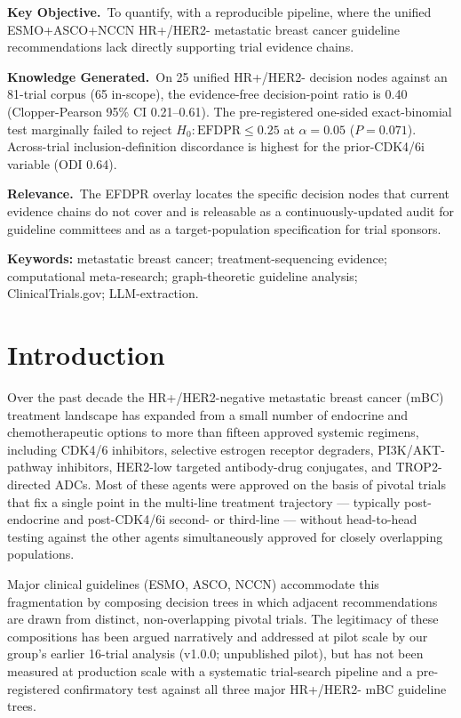 \documentclass[11pt,a4paper]{article}
\begin{document}
\medskip
\begin{mdframed}[linewidth=0.5pt,roundcorner=4pt,backgroundcolor=gray!8]
\small
\textbf{Key Objective.}\,
To quantify, with a reproducible pipeline, where the unified ESMO+ASCO+NCCN HR+/HER2- metastatic breast cancer guideline recommendations lack directly supporting trial evidence chains.

\textbf{Knowledge Generated.}\,
On 25 unified HR+/HER2- decision nodes against an 81-trial corpus (65 in-scope), the evidence-free decision-point ratio is 0.40 (Clopper-Pearson 95\% CI 0.21--0.61). The pre-registered one-sided exact-binomial test marginally failed to reject $H_0: \mathrm{EFDPR} \le 0.25$ at $\alpha = 0.05$ ($P = 0.071$). Across-trial inclusion-definition discordance is highest for the prior-CDK4/6i variable (ODI 0.64).

\textbf{Relevance.}\,
The EFDPR overlay locates the specific decision nodes that current evidence chains do not cover and is releasable as a continuously-updated audit for guideline committees and as a target-population specification for trial sponsors.
\end{mdframed}

\medskip
\noindent\textbf{Keywords:} metastatic breast cancer; treatment-sequencing evidence; computational meta-research; graph-theoretic guideline analysis; ClinicalTrials.gov; LLM-extraction.

\section{Introduction}\label{sec:intro}
Over the past decade the HR+/HER2-negative metastatic breast cancer (mBC) treatment landscape has expanded from a small number of endocrine and chemotherapeutic options to more than fifteen approved systemic regimens, including CDK4/6 inhibitors, selective estrogen receptor degraders, PI3K/AKT-pathway inhibitors, HER2-low targeted antibody-drug conjugates, and TROP2-directed ADCs.\citep{cardosoESMO2024,gradishar2023nccn,giordano2022asco} Most of these agents were approved on the basis of pivotal trials that fix a single point in the multi-line treatment trajectory --- typically post-endocrine and post-CDK4/6i second- or third-line --- without head-to-head testing against the other agents simultaneously approved for closely overlapping populations.

Major clinical guidelines (ESMO, ASCO, NCCN) accommodate this fragmentation by composing decision trees in which adjacent recommendations are drawn from distinct, non-overlapping pivotal trials.\citep{cardosoESMO2024,giordano2022asco,gradishar2023nccn} The legitimacy of these compositions has been argued narratively\citep{turner2023evidence,bardia2024hergap} and addressed at pilot scale by our group's earlier 16-trial analysis (v1.0.0; unpublished pilot), but has not been measured at production scale with a systematic trial-search pipeline and a pre-registered confirmatory test against all three major HR+/HER2- mBC guideline trees.
\end{document}
